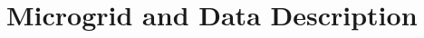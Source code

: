\documentclass[conference]{IEEEtran}
\begin{document}
%
%
%
%
%
%
%

\section{Microgrid and Data Description}
\end{document}
